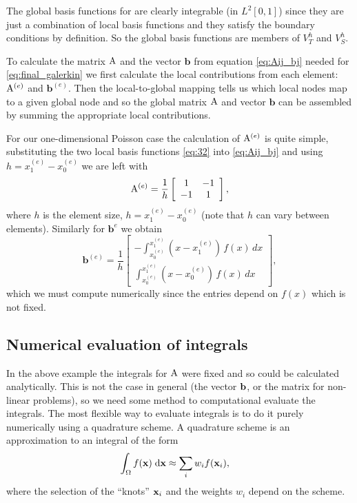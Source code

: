 The global basis functions for are clearly integrable (\ie in $L^2[0,1]$) since they are just a combination of local basis functions and they satisfy the boundary conditions by definition.
So the global basis functions are members of $V_T^h$ and $V_S^h$.

To calculate the matrix $\mathrm{A}$ and the vector $\mathbf{b}$ from equation \cref{eq:Aij_bj} needed for \cref{eq:final_galerkin} we first calculate the local contributions from each element: $\mathrm{A}^{(e)}$ and $\mathbf{b}^{(e)}$.
Then the local-to-global mapping tells us which local nodes map to a given global node and so the global matrix $\mathrm{A}$ and vector $\mathbf{b}$ can be assembled by summing the appropriate local contributions.

For our one-dimensional Poisson case the calculation of $\mathrm{A}^{(e)}$ is quite
simple, substituting the two local basis functions \cref{eq:32} into
\cref{eq:Aij_bj} and using $h=x_{1}^{(e)}-x_{0}^{(e)}$ we are left with
\begin{equation}
  \mathrm{A}^{(e)} = \dfrac{1}{h}
  \left[
    \begin{array}{cc}
      1 & -1 \\ -1 & 1
    \end{array}
  \right],
\end{equation}
where $h$ is the element size, $h = x_{1}^{(e)}-x_{0}^{(e)}$ (note that $h$ can vary between elements).
Similarly for $\mathbf{b}^{{e}}$ we obtain
\begin{equation}
  \mathbf{b}^{(e)}=\dfrac{1}{h}\left[
    \begin{array}{c}
      -\int_{x_{0}^{(e)}}^{x_{1}^{(e)}}(x-x_{1}^{(e)})\, f(x)\, dx\\
      \int_{x_{0}^{(e)}}^{x_{1}^{(e)}}(x-x_{0}^{(e)})\, f(x)\, dx
    \end{array}\right],
\end{equation}
which we must compute numerically since the entries depend on $f(x)$ which is not fixed.



\subsection{Numerical evaluation of integrals}
\label{sec:numer-eval-integrals}

In the above example the integrals for $\mathrm{A}$ were fixed and so could be calculated analytically.
This is not the case in general (\eg the vector ${\mathbf{b}}$, or the matrix for non-linear problems), so we need some method to computational evaluate the integrals.
The most flexible way to evaluate integrals is to do it purely numerically using a quadrature scheme.
A quadrature scheme is an approximation to an integral of the form
\begin{equation}
  \begin{aligned}
    {\int_{\Omega} f(\mathbf{x}) {\; \text{d}}\mathbf{x}} &\approx  \sum_i w_i f(\mathbf{x}_i),
  \end{aligned}
\end{equation}
where the selection of the ``knots'' $\mathbf{x}_i$ and the weights $w_i$ depend on the scheme.

